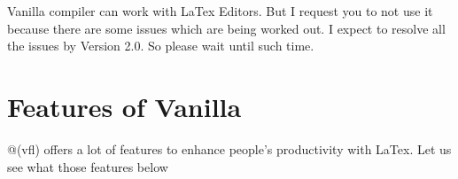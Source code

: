 \documentclass{article}
\begin{document}
\begin{enumerate}
\begin{itemize}
\end{itemize}

 
\end{enumerate}

Vanilla compiler can work with LaTex Editors. But I request you to not use it because there are some issues which are being worked out. I expect to resolve all the issues by Version 2.0. So please wait until such time.

\section*{Features of Vanilla}

@(vfl) offers a lot of features to enhance people's productivity with LaTex. Let us see what those features below
\end{document}
